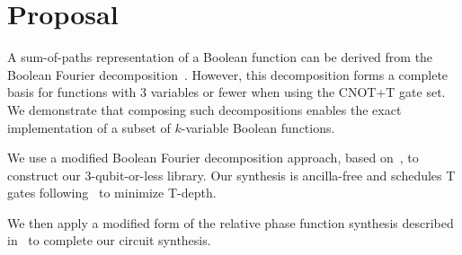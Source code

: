 \section{Proposal}

A sum-of-paths representation of a Boolean function can be derived from the Boolean Fourier decomposition~\cite{odonnell}. However, this decomposition forms a complete basis for functions with 3 variables or fewer when using the CNOT+T gate set. We demonstrate that composing such decompositions enables the exact implementation of a subset of $k$-variable Boolean functions.

We use a modified Boolean Fourier decomposition approach, based on~\cite{amy_duality}, to construct our 3-qubit-or-less library. Our synthesis is ancilla-free and schedules T gates following~\cite{amy2018} to minimize T-depth.

We then apply a modified form of the relative phase function synthesis described in~\cite{amy_relphase} to complete our circuit synthesis.

